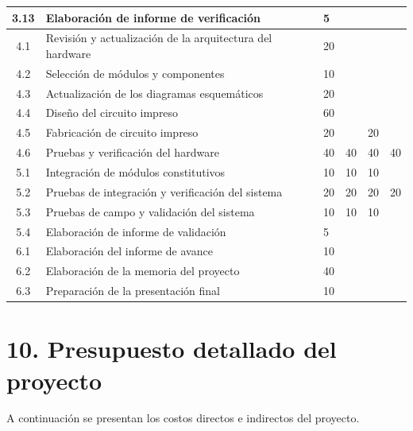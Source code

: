 \documentclass[11pt]{charter}
\begin{document}
\begin{table}[!htpb]
\begin{center}
\begin{tabularx}{\linewidth}{@{}|c|X|m{0.8cm}|m{1.4cm}|m{1.3cm}|m{1.1cm}|@{}}
  3.13 & Elaboración de informe de verificación & 5 & & & \\ \hline
  4.1 & Revisión y actualización de la arquitectura del hardware & 20 & & & \\ \hline
  4.2 & Selección de módulos y componentes & 10 & & & \\ \hline
  4.3 & Actualización de los diagramas esquemáticos & 20 & & & \\  \hline
  4.4 & Diseño del circuito impreso & 60 & & & \\ \hline
  4.5 & Fabricación de circuito impreso & 20 & & 20 & \\  \hline
  4.6 & Pruebas y verificación del hardware & 40 & 40 & 40 & 40 \\ \hline
  5.1 & Integración de módulos constitutivos & 10 & 10 & 10 & \\ \hline
  5.2 & Pruebas de integración y verificación del sistema & 20 & 20 & 20 & 20 \\ \hline
  5.3 & Pruebas de campo y validación del sistema & 10 & 10 & 10 & \\ \hline
  5.4 & Elaboración de informe de validación & 5 & & & \\ \hline
  6.1 & Elaboración del informe de avance & 10 & & & \\ \hline
  6.2 & Elaboración de la memoria del proyecto & 40 & & & \\ \hline
  6.3 & Preparación de la presentación final & 10 & & & \\ \hline
  \end{tabularx}
\end{center}
\label{tab:recursos}
\end{table}

\newpage

\section{10. Presupuesto detallado del proyecto}
\label{sec:presupuesto}

A continuación se presentan los costos directos e indirectos del proyecto.
\end{document}
